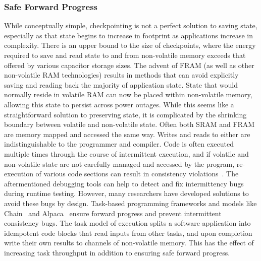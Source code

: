 \subsubsection{Safe Forward Progress}
While conceptually simple, checkpointing is not a perfect solution to saving state, especially as that state begins to increase in footprint as applications increase in complexity. 
There is an upper bound to the size of checkpoints, where the energy required to save and read state to and from non-volatile memory exceeds that offered by various capacitor storage sizes.
The advent of FRAM (as well as other non-volatile RAM technologies) results in methods that can avoid explicitly saving and reading back the majority of application state. State that would normally reside in volatile RAM can now be placed within non-volatile memory, allowing this state to persist across power outages.
While this seems like a straightforward solution to preserving state, it is complicated by the shrinking
boundary between volatile and non-volatile state. Often both SRAM and FRAM are memory mapped and accessed the same way. Writes and reads to either are indistinguishable to the programmer and compiler.
Code is often executed multiple times through the course of intermittent execution, and if volatile and non-volatile state are not carefully managed and accessed by the program, re-execution of various code sections can result in consistency violations~\cite{maeng2017alpaca}.
The aftermentioned debugging tools can help to detect and fix intermittency bugs during runtime testing. However, many researchers have developed solutions to avoid these bugs by design.
Task-based programming frameworks and models like
Chain~\cite{colin2016chain} and Alpaca~\cite{maeng2017alpaca}
ensure forward progress and prevent intermittent consistency bugs.
The task model of execution splits a software application into idempotent code blocks that read inputs from other tasks, and upon completion write their own results to channels of non-volatile memory. This has the effect of increasing task throughput in addition to ensuring safe forward progress.

